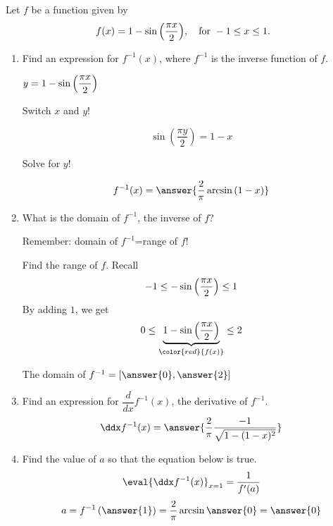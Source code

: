 \documentclass{ximera}
\author{Nela Lakos}
\begin{document}
\begin{exercise}

 Let $f$ be a function given by
 \[
 f(x)=1-\sin{\Bigl(\dfrac{\pi x}{2}\Bigr)}, \quad\text{for }-1\le x \le1.
 \]
 
\begin{enumerate}

\item Find an expression for $f^{-1}(x)$, where $f^{-1}$ is the inverse function of $f$.

\begin{hint}
\(y=1-\sin{\Bigl(\dfrac{\pi x}{2}\Bigr)}\)


Switch $x$ and $y$!
\end{hint}
\begin{hint}
\[
 \sin{\left(\dfrac{\pi y}{2}\right)}=1-x
 \]

Solve for $y$!

\end{hint}


\[
f^{-1}(x)=\answer{\frac{2}{\pi} \arcsin{(1-x)}}
\]


\item What is the domain of $f^{-1}$, the inverse of $f$?

\begin{hint}
Remember: domain of $f^{-1}$=range of $f$!
\end{hint} 
 \begin{hint}
 Find the range of $f$. Recall
 \[
 -1\le -\sin{\Bigl(\dfrac{\pi x}{2}\Bigr)}\le1
 \]
 By adding $1$, we get 
\[
0\le\underbrace{1-\sin{\Bigl(\dfrac{\pi x}{2}\Bigr)}}_{\color{red}{f(x)}}\le2
\]

\end{hint}
The domain of $f^{-1}=\left[\answer{0},\answer{2}\right]$

 
\item  Find an expression for $\dfrac{d}{dx}f^{-1}(x)$, the derivative of $f^{-1}$.
	   \[
	   \ddx f^{-1}(x)=\answer{\frac{2}{\pi }\frac{-1}{\sqrt{1-(1-x)^2}}}
	   \]
	 \item   Find the value of $a$ so that the equation below is true.
	   \[
           \eval{\ddx f^{-1}(x)}_{x=1}=\frac{1}{f'(a)}
           \]
	   \[
	   a=f^{-1}\left(\answer{1}\right)=\frac{2}{\pi }\arcsin{\answer{0}}=\answer{0}
	   \]
\end{enumerate}
\end{exercise}
\end{document}
